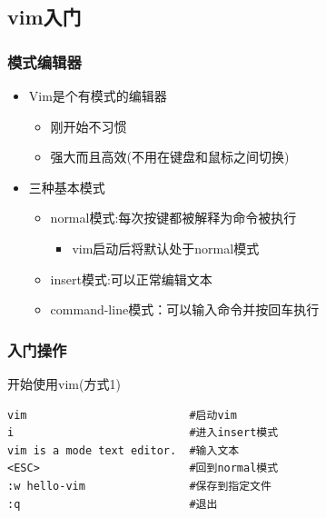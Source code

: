\documentclass[xcolor=svgnames,presentation]{beamer}
\begin{document}
\subsection{vim入门}
\label{sec-4-1}
\begin{frame}
\frametitle{模式编辑器}
\label{sec-4-1-1}
\begin{itemize}

\item Vim是个有模式的编辑器
\label{sec-4-1-1-1}%
\begin{itemize}

\item 刚开始不习惯
\label{sec-4-1-1-1-1}%

\item 强大而且高效(不用在键盘和鼠标之间切换)
\label{sec-4-1-1-1-2}%
\end{itemize} %

\item 三种基本模式
\label{sec-4-1-1-2}%
\begin{itemize}

\item normal模式:每次按键都被解释为命令被执行
\label{sec-4-1-1-2-1}%
\begin{itemize}

\item vim启动后将默认处于normal模式
\label{sec-4-1-1-2-1-1}%
\end{itemize} %

\item insert模式:可以正常编辑文本
\label{sec-4-1-1-2-2}%

\item command-line模式：可以输入命令并按回车执行
\label{sec-4-1-1-2-3}%
\end{itemize} %
\end{itemize} %
\end{frame}
\begin{frame}[fragile]
\frametitle{入门操作}
\label{sec-4-1-2}
\begin{exampleblock}{开始使用vim(方式1)}
\label{sec-4-1-2-1}


\begin{verbatim}
vim                         #启动vim
i                           #进入insert模式
vim is a mode text editor.  #输入文本
<ESC>                       #回到normal模式
:w hello-vim                #保存到指定文件
:q                          #退出
\end{verbatim}
\end{exampleblock}
\end{frame}
\end{document}
